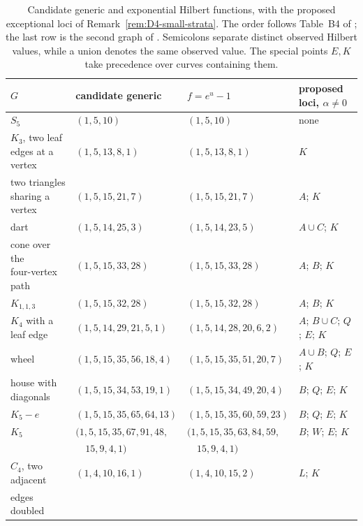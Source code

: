 \documentclass[reqno]{article}
\theoremstyle{plain} %
\theoremstyle{definition}
\theoremstyle{remark}
\numberwithin{equation}{section}
\begin{document}
\begin{table}[t]
\centering\small
\setlength{\tabcolsep}{4pt}
\renewcommand{\arraystretch}{1.15}
\begin{tabular}{@{}lllp{3.6cm}@{}}
\toprule
$G$ & candidate generic & $f=e^u-1$ & proposed loci, $\alpha\ne0$\\\midrule
$S_5$ & $(1,5,10)$ & $(1,5,10)$ & none\\
$K_3$, two leaf edges at a vertex & $(1,5,13,8,1)$ & $(1,5,13,8,1)$ & $K$\\
two triangles sharing a vertex & $(1,5,15,21,7)$ & $(1,5,15,21,7)$ & $A$; $K$\\
dart & $(1,5,14,25,3)$ & $(1,5,14,23,5)$ & $A\cup C$; $K$\\
\shortstack[l]{cone over the\\four-vertex path} & $(1,5,15,33,28)$ & $(1,5,15,33,28)$ & $A$; $B$; $K$\\
$K_{1,1,3}$ & $(1,5,15,32,28)$ & $(1,5,15,32,28)$ & $A$; $B$; $K$\\
$K_4$ with a leaf edge & $(1,5,14,29,21,5,1)$ & $(1,5,14,28,20,6,2)$ & $A$; $B\cup C$; $Q$; $E$; $K$\\
wheel & $(1,5,15,35,56,18,4)$ & $(1,5,15,35,51,20,7)$ & $A\cup B$; $Q$; $E$; $K$\\
house with diagonals & $(1,5,15,34,53,19,1)$ & $(1,5,15,34,49,20,4)$ & $B$; $Q$; $E$; $K$\\
$K_5-e$ & $(1,5,15,35,65,64,13)$ & $(1,5,15,35,60,59,23)$ & $B$; $Q$; $E$; $K$\\
$K_5$ & $(1,5,15,35,67,91,48,$ & $(1,5,15,35,63,84,59,$ & $B$; $W$; $E$; $K$\\
 & $\quad15,9,4,1)$ & $\quad15,9,4,1)$ & \\\midrule
$C_4$, two adjacent & $(1,4,10,16,1)$ & $(1,4,10,15,2)$ & $L$; $K$\\
\quad edges doubled &&&\\\bottomrule
\end{tabular}
\caption{Candidate generic and exponential Hilbert functions, with the
proposed exceptional loci of Remark~\ref{rem:D4-small-strata}. The order
follows Table~B4 of \cite[\texttt{tables/}]{Cert}; the last row is the
second graph of \cite[Example~2]{NSh}. Semicolons separate distinct
observed Hilbert values, while a union denotes the same observed value. The special points $E,K$
take precedence over curves containing them.}
\label{tab:exp-small}
\end{table}
\end{document}
